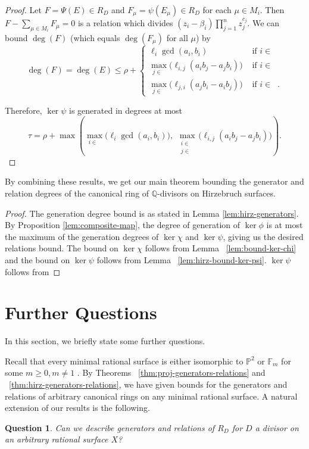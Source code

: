 \documentclass{amsart}
\theoremstyle{plain}
\newtheorem{question}[thm]{Question}
\theoremstyle{definition}
\theoremstyle{remark}
\numberwithin{equation}{section}
\newcommand\bq{{\mathbb Q}}
\newcommand\bp{{\mathbb P}}
\newcommand\bida{a}
\newcommand\bidb{b}
\newcommand\hirz{\mathbb{F}}
\DeclareMathOperator{\Te}{T_=}
\DeclareMathOperator{\Tp}{T_+}
\DeclareMathOperator{\Tm}{T_-}
\begin{document}
\begin{proof}
Let $F = \Psi(E) \in R_D$ and $F_\mu = \psi(E_\mu)
\in R_D$ for each $\mu \in M_i$.  
Then $F - \sum_{\mu \in M_i} F_\mu = 0$ is a relation %
which divides $(z_i - \beta_i) \prod_{j = 1}^n z_j^{c_j}$. 
We can bound $\deg(F)$ (which equals $\deg(F_\mu)$ for all $\mu$) by
\[
	\deg(F) = \deg(E) \le \rho + \begin{cases}
	\ell_i \gcd(\bida_i, \bidb_i)	&\mbox{ if } i \in \Te \\
	\max_{j \in \Tm} \bigl(\ell_{i, j} (\bida_i \bidb_j - \bida_j \bidb_i)\bigr)
	&\mbox{ if } i \in \Tp \\
	\max_{j \in \Tp} \bigl(\ell_{j, i} (\bida_j \bidb_ i - \bida_i \bidb_j) \bigr)
	&\mbox{ if } i \in \Tm. \end{cases}
	\]

\noindent
Therefore, $\ker \psi$ is generated in degrees at most
\[
	\tau = \rho
	+ \max \left(\max_{i\in \Te} \bigl(\ell_i \gcd(a_i, b_i) \bigr),
	\; \max_{\substack{i \in \Tp \\ j \in \Tm}} \bigl(\ell_{i, j}
	(\bida_i \bidb_j - \bida_j
	\bidb_i) \bigr) \right).
\]
\end{proof}

By combining these results, we get our main theorem bounding
the generator and relation degrees of the canonical ring of
$\bq$-divisors on Hirzebruch surfaces.

\hirzrestate*

\begin{proof}
The generation degree bound is as stated in Lemma \ref{lem:hirz-generators}.
By Proposition \ref{lem:composite-map}, the degree of generation of
$\ker \phi$ is at most the maximum of the generation degrees of $\ker \chi$
and $\ker \psi$, giving us the desired relations bound. The bound on $\ker \chi$
follows from Lemma ~\ref{lem:bound-ker-chi} and the bound on $\ker \psi$
follows from Lemma ~\ref{lem:hirz-bound-ker-psi}.
$\ker \psi$ follows from 
\end{proof}


\section{Further Questions}
\label{sec:conc}
In this section, we briefly state some further questions.

Recall that every minimal rational surface is either isomorphic to
$\bp^2$ or $\hirz_m$ for some $m \geq 0, m \neq 1$ . By Theorems
~\ref{thm:proj-generators-relations} and ~\ref{thm:hirz-generators-relations}, we have given bounds for the generators and relations
of arbitrary canonical rings on any minimal rational surface. A
natural extension of our results is the following.
\begin{question}
\label{qn:general-minimal-surface}
Can we describe generators and relations of $R_D$ for $D$ a divisor on an
arbitrary rational surface $X$?
\end{question}
\end{document}
